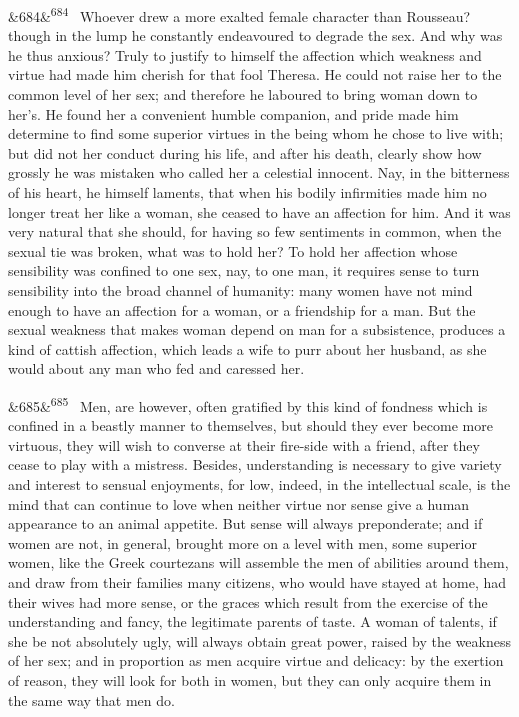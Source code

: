 \documentclass[12pt]{article}
\newcommand{\para}[1][]{\par\noindent\ifx&#1&\else\textsuperscript{\footnotesize #1}~\fi}
\begin{document}
\para[684] Whoever drew a more exalted female character than Rousseau? though in the lump he constantly endeavoured to degrade the sex. And why was he thus anxious? Truly to justify to himself the affection which weakness and virtue had made him cherish for that fool Theresa. He could not raise her to the common level of her sex; and therefore he laboured to bring woman down to her's. He found her a convenient humble companion, and pride made him determine to find some superior virtues in the being whom he chose to live with; but did not her conduct during his life, and after his death, clearly show how grossly he was mistaken who called her a celestial innocent. Nay, in the bitterness of his heart, he himself laments, that when his bodily infirmities made him no longer treat her like a woman, she ceased to have an affection for him. And it was very natural that she should, for having so few sentiments in common, when the sexual tie was broken, what was to hold her? To hold her affection whose sensibility was confined to one sex, nay, to one man, it requires sense to turn sensibility into the broad channel of humanity: many women have not mind enough to have an affection for a woman, or a friendship for a man. But the sexual weakness that makes woman depend on man for a subsistence, produces a kind of cattish affection, which leads a wife to purr about her husband, as she would about any man who fed and caressed her.

\para[685] Men, are however, often gratified by this kind of fondness which is confined in a beastly manner to themselves, but should they ever become more virtuous, they will wish to converse at their fire-side with a friend, after they cease to play with a mistress. Besides, understanding is necessary to give variety and interest to sensual enjoyments, for low, indeed, in the intellectual scale, is the mind that can continue to love when neither virtue nor sense give a human appearance to an animal appetite. But sense will always preponderate; and if women are not, in general, brought more on a level with men, some superior women, like the Greek courtezans will assemble the men of abilities around them, and draw from their families many citizens, who would have stayed at home, had their wives had more sense, or the graces which result from the exercise of the understanding and fancy, the legitimate parents of taste. A woman of talents, if she be not absolutely ugly, will always obtain great power, raised by the weakness of her sex; and in proportion as men acquire virtue and delicacy: by the exertion of reason, they will look for both in women, but they can only acquire them in the same way that men do.
\end{document}
